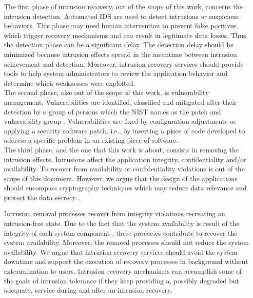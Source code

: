The first phase of intrusion recovery, out of the scope of this work, concerns the intrusion detection. Automated \ac{IDS} are used to detect intrusions or suspicious behaviors. This phase may need human intervention to prevent false positives, which trigger recovery mechanisms and can result in legitimate data losses. Thus the detection phase can be a significant delay. The detection delay should be minimized because intrusion effects spread in the meantime between intrusion achievement and detection. Moreover, intrusion recovery services should provide tools to help system administrators to review the application behavior and determine which weaknesses were exploited. \\

The second phase, also out of the scope of this work, is vulnerability management. Vulnerabilities are identified, classified and mitigated after their detection by a group of persons which the \ac{NIST} names as the patch and vulnerability group \cite{Mell2005}. Vulnerabilities are fixed by configuration adjustments or applying a security software patch, i.e., by inserting a piece of code developed to address a specific problem in an existing piece of software. \\

The third phase, and the one that this work is about, consists in removing the intrusion effects. Intrusions affect the application integrity, confidentiality and/or availability. To recover from availability or confidentiality violations is out of the scope of this document. However, we argue that the design of the applications should encompass cryptography techniques which may reduce data relevance and protect the data secrecy \cite{Maheshwari2000}.

Intrusion removal processes recover from integrity violations recreating an intrusion-free state. Due to the fact that the system availability is result of the integrity of each system component \cite{Wang2007}, these processes contribute to recover the system availability. Moreover, the removal processes should not reduce the system availability. We argue that intrusion recovery services should avoid the system downtime and support the execution of recovery processes in background without externalization to users. Intrusion recovery mechanisms can accomplish some of the goals of intrusion tolerance if they keep providing a, possibly degraded but adequate, service during and after an intrusion recovery.

